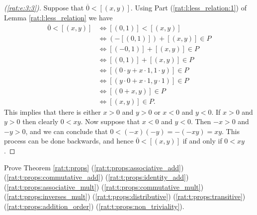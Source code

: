 \begin{proof}[(\ref{rat:e:3:3})]
	Suppose that $\overline{0} < [(x, y)]$. Using Part (\ref{rat:l:less_relation:1}) of Lemma \ref{rat:l:less_relation}  we have
	\begin{align*}
		\overline{0} < [(x, y)] & \iff [(0, 1)] < [(x, y)]                         \\
		                        & \iff (-[(0, 1)]) + [(x, y)] \in P                \\
		                        & \iff [(-0, 1)] + [(x, y)] \in P                  \\
		                        & \iff [(0, 1)] + [(x, y)] \in P                   \\
		                        & \iff [(0 \cdot y + x \cdot 1, 1 \cdot y )] \in P \\
		                        & \iff [(y \cdot 0 + x \cdot 1, y \cdot 1)] \in P  \\
		                        & \iff [(0 + x, y)] \in P                          \\
		                        & \iff [(x, y)] \in P.
	\end{align*}
	This implies that there is either $x > 0$ and $y > 0$ or $x < 0$ and $y < 0$. If $x > 0$ and $y > 0$ then clearly $0 < x y$. Now suppose that $x < 0$ and $y < 0$. Then $-x > 0$ and $-y > 0$, and we can conclude that $0 < (-x)(-y) = -(-x y) = x y$. This process can be done backwards, and hence $\overline{0} < [(x, y)]$ if and only if $0 < x y$.
\end{proof}


\Newpage
\ratLessRelL*

\ratNegationL*

\begin{exercise} %
	Prove Theorem \ref{rat:t:props} (\ref{rat:t:props:associative_add}) (\ref{rat:t:props:commutative_add}) (\ref{rat:t:props:identity_add}) (\ref{rat:t:props:associative_mult}) (\ref{rat:t:props:commutative_mult}) (\ref{rat:t:props:inverses_mult}) (\ref{rat:t:props:distributive}) (\ref{rat:t:props:transitive}) (\ref{rat:t:props:addition_order}) (\ref{rat:t:props:non_triviality}).
\end{exercise}

